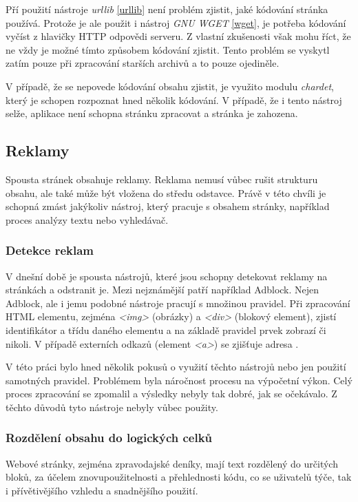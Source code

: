 Pří použití nástroje \textit{urllib} \ref{urllib} není problém zjistit, jaké kódování stránka používá. Protože je ale použit
i nástroj \textit{GNU WGET} \ref{wget}, je potřeba kódování vyčíst z hlavičky HTTP odpovědi serveru. Z vlastní zkušenosti však mohu říct, že
ne vždy je možné tímto způsobem kódování zjistit. Tento problém se vyskytl zatím pouze při zpracování starších archivů a to pouze ojediněle.

V případě, že se nepovede kódování obsahu zjistit, je využito modulu \textit{chardet}, který je schopen rozpoznat
hned několik kódování. V případě, že i tento nástroj selže, aplikace není schopna stránku zpracovat a stránka je zahozena.

\subsection{Reklamy}
Spousta stránek obsahuje reklamy. Reklama nemusí vůbec rušit strukturu obsahu, ale také může být vložena do středu
odstavce. Právě v této chvíli je schopná zmást jakýkoliv nástroj, který pracuje s obsahem stránky,
například proces analýzy textu nebo vyhledávač.

\subsubsection{Detekce reklam}
V dnešní době je spousta nástrojů, které jsou schopny detekovat reklamy na stránkách a odstranit je. Mezi nejznámější
patří například Adblock. Nejen Adblock, ale i jemu podobné nástroje pracují s množinou pravidel. Při zpracování HTML
elementu, zejména \textit{<img>} (obrázky) a \textit{<div>} (blokový element), zjistí identifikátor a třídu daného elementu a na
základě pravidel prvek zobrazí či nikoli. V případě externích odkazů (element \textit{<a>}) se zjišťuje adresa \cite{ADBLOCK}.

V této práci bylo hned několik pokusů o využití těchto nástrojů nebo jen použití samotných pravidel. Problémem byla náročnost procesu
na výpočetní výkon. Celý proces zpracování se zpomalil a výsledky nebyly tak dobré, jak se očekávalo. Z těchto důvodů tyto nástroje
nebyly vůbec použity.

\subsubsection{Rozdělení obsahu do logických celků}
Webové stránky, zejména zpravodajské deníky, mají text rozdělený do určitých bloků, za účelem
znovupoužitelnosti a přehlednosti kódu, co se uživatelů týče, tak i přívětivějšího vzhledu a
snadnějšího použití.

